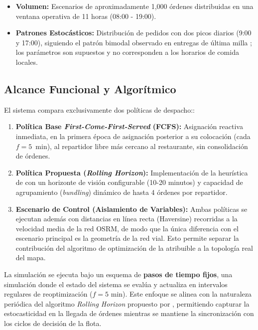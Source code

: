 \documentclass[12pt,letterpaper,oneside]{book}
\begin{document}
\begin{itemize}
	\item \textbf{Volumen:} Escenarios de aproximadamente 1,000 órdenes distribuidas en una ventana 
	operativa de 11 horas (08:00 - 19:00).
	
	\item \textbf{Patrones Estocásticos:} Distribución de pedidos con dos picos diarios (9:00 y 17:00),
	siguiendo el patrón bimodal observado en entregas de última milla \cite{Wu2023LaDe}; los parámetros
	son supuestos y no corresponden a los horarios de comida locales.
	
\end{itemize}

\subsection{Alcance Funcional y Algorítmico}
El sistema compara exclusivamente dos políticas de despacho::

\begin{enumerate}
	\item \textbf{Política Base \textit{First-Come-First-Served} (FCFS):} Asignación reactiva inmediata,
	en la primera época de asignación posterior a su colocación (cada $f = 5$~min), al repartidor libre más cercano al restaurante, sin consolidación de órdenes.
	
	\item \textbf{Política Propuesta (\textit{Rolling Horizon}):} Implementación de la heurística de
	\citet{Reyes2018} con un horizonte de visión configurable (10-20 minutos) y capacidad de 
	agrupamiento (\textit{bundling}) dinámico de hasta 4 órdenes por repartidor.
	
	\item \textbf{Escenario de Control (Aislamiento de Variables):} Ambas políticas se ejecutan
	además con distancias en línea recta (Haversine) recorridas a la velocidad media de la red OSRM,
	de modo que la única diferencia con el escenario principal es la geometría de la red vial. Esto
	permite separar la contribución del algoritmo de optimización de la atribuible a la topología
	real del mapa.
\end{enumerate}

La simulación se ejecuta bajo un esquema de \textbf{pasos de tiempo fijos}, una 
simulación donde el estado del sistema se evalúa y actualiza en intervalos regulares de reoptimización 
($f=5$ min). Este enfoque se alinea con la naturaleza periódica del algoritmo \textit{Rolling Horizon} propuesto 
por \citet{Reyes2018}, permitiendo capturar la estocasticidad en la llegada de órdenes mientras se mantiene la 
sincronización con los ciclos de decisión de la flota.
\end{document}
